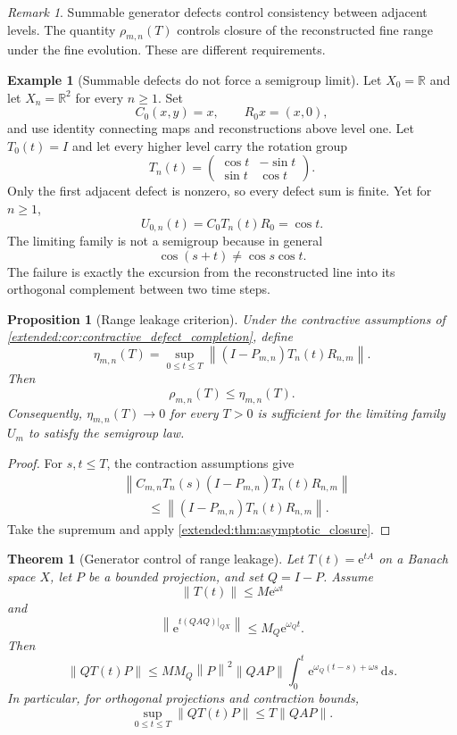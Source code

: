 \documentclass[11pt,letterpaper]{article}
\newtheorem{theorem}{Theorem}[section]
\theoremstyle{plain}
\newtheorem{proposition}[proposition]{Proposition}
\theoremstyle{plain}
\theoremstyle{plain}
\theoremstyle{definition}
\theoremstyle{definition}
\theoremstyle{definition}
\newtheorem{example}[example]{Example}
\theoremstyle{definition}
\theoremstyle{definition}
\theoremstyle{remark}
\theoremstyle{remark}
\newtheorem{remark}[remark]{Remark}
\theoremstyle{remark}
\theoremstyle{remark}
\theoremstyle{remark}
\newcommand{\norm}[1]{\left\lVert#1\right\rVert}
\theoremstyle{remark}
\newcommand{\RR}{\mathbb R}
\newcommand{\e}{\mathrm e}
\newcommand{\dd}{\,\mathrm d}
\let\KomorebiPrimitivemathbb\mathbb
\renewcommand{\mathbb}[1]{{\KomorebiPrimitivemathbb{#1}}}
\let\KomorebiPrimitivemathrm\mathrm
\renewcommand{\mathrm}[1]{{\KomorebiPrimitivemathrm{#1}}}
\begin{document}
\begin{remark}\label{extended:record:023}
Summable generator defects control consistency between adjacent levels. The quantity \(\rho_{m,n}(T)\) controls closure of the reconstructed fine range under the fine evolution. These are different requirements.
\end{remark}

\begin{example}[Summable defects do not force a semigroup limit]\label{extended:record:024}\label{extended:ex:summable_not_semigroup}
Let \(X_0=\RR\) and let \(X_n=\RR^2\) for every \(n\geq1\). Set
\[
C_0(x,y)=x,
\qquad
R_0x=(x,0),
\]
and use identity connecting maps and reconstructions above level one. Let \(T_0(t)=I\) and let every higher level carry the rotation group
\[
T_n(t)
=
\begin{pmatrix}
\cos t&-\sin t\\
\sin t&\cos t
\end{pmatrix}.
\]
Only the first adjacent defect is nonzero, so every defect sum is finite. Yet for \(n\geq1\),
\[
U_{0,n}(t)=C_0T_n(t)R_0=\cos t.
\]
The limiting family is not a semigroup because in general
\[
\cos(s+t)\neq\cos s\cos t.
\]
The failure is exactly the excursion from the reconstructed line into its orthogonal complement between two time steps.
\end{example}

\begin{proposition}[Range leakage criterion]\label{extended:record:025}\label{extended:prop:range_leakage}
Under the contractive assumptions of \cref{extended:cor:contractive_defect_completion}, define
\[
\eta_{m,n}(T)
=
\sup_{0\leq t\leq T}
\norm{(I-P_{m,n})T_n(t)R_{n,m}}.
\]
Then
\[
\rho_{m,n}(T)\leq\eta_{m,n}(T).
\]
Consequently, \(\eta_{m,n}(T)\to0\) for every \(T>0\) is sufficient for the limiting family \(U_m\) to satisfy the semigroup law.
\end{proposition}

\begin{proof}
For \(s,t\leq T\), the contraction assumptions give
\[
\begin{aligned}
&\norm{
C_{m,n}T_n(s)(I-P_{m,n})T_n(t)R_{n,m}
}\\
&\qquad\leq
\norm{(I-P_{m,n})T_n(t)R_{n,m}}.
\end{aligned}
\]
Take the supremum and apply \cref{extended:thm:asymptotic_closure}.
\end{proof}

\begin{theorem}[Generator control of range leakage]\label{extended:record:026}\label{extended:thm:generator_range_leakage}
Let \(T(t)=\e^{tA}\) on a Banach space \(X\), let \(P\) be a bounded projection, and set \(Q=I-P\). Assume
\[
\norm{T(t)}\leq M\e^{\omega t}
\]
and
\[
\norm{\e^{t(QAQ)|_{QX}}}
\leq M_Q\e^{\omega_Qt}.
\]
Then
\[
\norm{QT(t)P}
\leq
M M_Q\norm P^2\norm{QAP}
\int_0^t
\e^{\omega_Q(t-s)+\omega s}
\dd s.
\]
In particular, for orthogonal projections and contraction bounds,
\[
\sup_{0\leq t\leq T}
\norm{QT(t)P}
\leq
T\norm{QAP}.
\]
\end{theorem}
\end{document}
